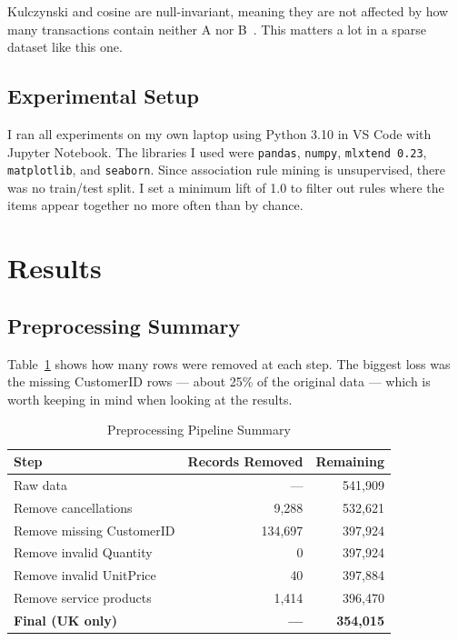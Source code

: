 \documentclass[conference]{IEEEtran}
\begin{document}
Kulczynski and cosine are null-invariant, meaning they are not affected by how many transactions contain neither A nor B~\cite{b3}. This matters a lot in a sparse dataset like this one.

\subsection{Experimental Setup}

I ran all experiments on my own laptop using Python 3.10 in VS Code with Jupyter Notebook. The libraries I used were \texttt{pandas}, \texttt{numpy}, \texttt{mlxtend 0.23}, \texttt{matplotlib}, and \texttt{seaborn}. Since association rule mining is unsupervised, there was no train/test split. I set a minimum lift of 1.0 to filter out rules where the items appear together no more often than by chance.

\section{Results}
\label{sec:results}

\subsection{Preprocessing Summary}

Table~\ref{tab:preprocessing} shows how many rows were removed at each step. The biggest loss was the missing CustomerID rows — about 25\% of the original data — which is worth keeping in mind when looking at the results.

\begin{table}[htbp]
    \caption{Preprocessing Pipeline Summary}
    \begin{center}
        \begin{tabular}{|l|r|r|}
            \hline
            \textbf{Step} & \textbf{Records Removed} & \textbf{Remaining} \\
            \hline
            Raw data & --- & 541,909 \\
            \hline
            Remove cancellations & 9,288 & 532,621 \\
            \hline
            Remove missing CustomerID & 134,697 & 397,924 \\
            \hline
            Remove invalid Quantity & 0 & 397,924 \\
            \hline
            Remove invalid UnitPrice & 40 & 397,884 \\
            \hline
            Remove service products & 1,414 & 396,470 \\
            \hline
            \textbf{Final (UK only)} & \textbf{---} & \textbf{354,015} \\
            \hline
        \end{tabular}
        \label{tab:preprocessing}
    \end{center}
\end{table}
\end{document}
